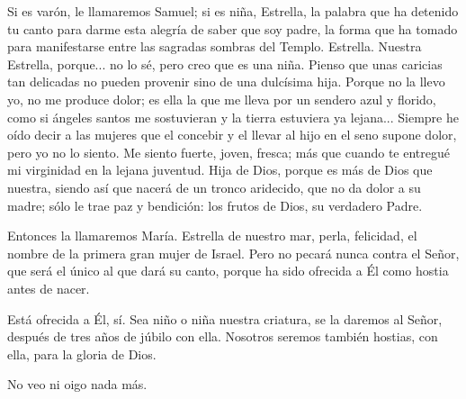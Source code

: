 \documentclass[12pt, twoside, openright]{book} %
\begin{document}
Si es varón, le llamaremos Samuel; si es niña, Estrella, la palabra que ha detenido tu canto para darme esta alegría de saber que soy padre, la forma que ha tomado para manifestarse entre las sagradas sombras del Templo. Estrella. Nuestra Estrella, porque... no lo sé, pero creo que es una niña. Pienso que unas caricias tan delicadas no pueden provenir sino de una dulcísima hija. Porque no la llevo yo, no me produce dolor; es ella la que me lleva por un sendero azul y florido, como si ángeles santos me sostuvieran y la tierra estuviera ya lejana... Siempre he oído decir a las mujeres que el concebir y el llevar al hijo en el seno supone dolor, pero yo no lo siento. Me siento fuerte, joven, fresca; más que cuando te entregué mi virginidad en la lejana juventud. Hija de Dios, porque es más de Dios que nuestra, siendo así que nacerá de un tronco aridecido, que no da dolor a su madre; sólo le trae paz y bendición: los frutos de Dios, su verdadero Padre. 

Entonces la llamaremos María. Estrella de nuestro mar, perla, felicidad, el nombre de la primera gran mujer de Israel. Pero no pecará nunca contra el Señor, que será el único al que dará su canto, porque ha sido ofrecida a Él como hostia antes de nacer. 

Está ofrecida a Él, sí. Sea niño o niña nuestra criatura, se la daremos al Señor, después de tres años de júbilo con ella. Nosotros seremos también hostias, con ella, para la gloria de Dios. 

No veo ni oigo nada más. 
\end{document}
